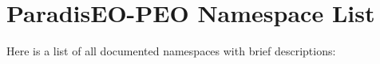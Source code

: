 \section{Paradis\-EO-PEO Namespace List}
Here is a list of all documented namespaces with brief descriptions:\begin{CompactList}
\item{}
\end{CompactList}
